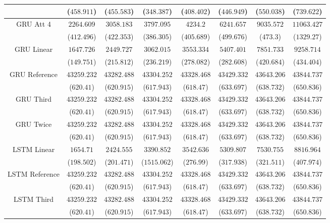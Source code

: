 \begin{table}[!ht]
{\begin{tabular}{|c|c|c|c|c|c|c|c|}
			 & ($458.911$) & ($455.583$) & ($348.387$) & ($408.402$) & ($446.949$) & ($550.038$) & ($739.622$) \\ \hline
			\multirow{2}{*}{GRU Att 4} & $2264.609$ & $3058.183$ & $3797.095$ & $4234.2$ & $6241.657$ & $9035.572$ & $11063.427$ \\
			 & ($412.496$) & ($422.353$) & ($386.305$) & ($405.689$) & ($499.676$) & ($473.3$) & ($1329.27$) \\ \hline
			\multirow{2}{*}{GRU Linear} & $1647.726$ & $2449.727$ & $3062.015$ & $3553.334$ & $5407.401$ & $7851.733$ & $9258.714$ \\
			 & ($149.751$) & ($215.812$) & ($236.219$) & ($278.082$) & ($282.608$) & ($420.684$) & ($434.404$) \\ \hline
			\multirow{2}{*}{GRU Reference} & $43259.232$ & $43282.488$ & $43304.252$ & $43328.468$ & $43429.332$ & $43643.206$ & $43844.737$ \\
			 & ($620.41$) & ($620.915$) & ($617.943$) & ($618.47$) & ($633.697$) & ($638.732$) & ($650.836$) \\ \hline
			\multirow{2}{*}{GRU Third} & $43259.232$ & $43282.488$ & $43304.252$ & $43328.468$ & $43429.332$ & $43643.206$ & $43844.737$ \\
			 & ($620.41$) & ($620.915$) & ($617.943$) & ($618.47$) & ($633.697$) & ($638.732$) & ($650.836$) \\ \hline
			\multirow{2}{*}{GRU Twice} & $43259.232$ & $43282.488$ & $43304.252$ & $43328.468$ & $43429.332$ & $43643.206$ & $43844.737$ \\
			 & ($620.41$) & ($620.915$) & ($617.943$) & ($618.47$) & ($633.697$) & ($638.732$) & ($650.836$) \\ \hline
			\multirow{2}{*}{LSTM Linear} & $1654.71$ & $2424.555$ & $3390.852$ & $3542.636$ & $5309.807$ & $7530.755$ & $8816.964$ \\
			 & ($198.502$) & ($201.471$) & ($1515.062$) & ($276.99$) & ($317.938$) & ($321.511$) & ($407.974$) \\ \hline
			\multirow{2}{*}{LSTM Reference} & $43259.232$ & $43282.488$ & $43304.252$ & $43328.468$ & $43429.332$ & $43643.206$ & $43844.737$ \\
			 & ($620.41$) & ($620.915$) & ($617.943$) & ($618.47$) & ($633.697$) & ($638.732$) & ($650.836$) \\ \hline
			\multirow{2}{*}{LSTM Third} & $43259.232$ & $43282.488$ & $43304.252$ & $43328.468$ & $43429.332$ & $43643.206$ & $43844.737$ \\
			 & ($620.41$) & ($620.915$) & ($617.943$) & ($618.47$) & ($633.697$) & ($638.732$) & ($650.836$) \\ \hline

\end{tabular}}
\end{table}

